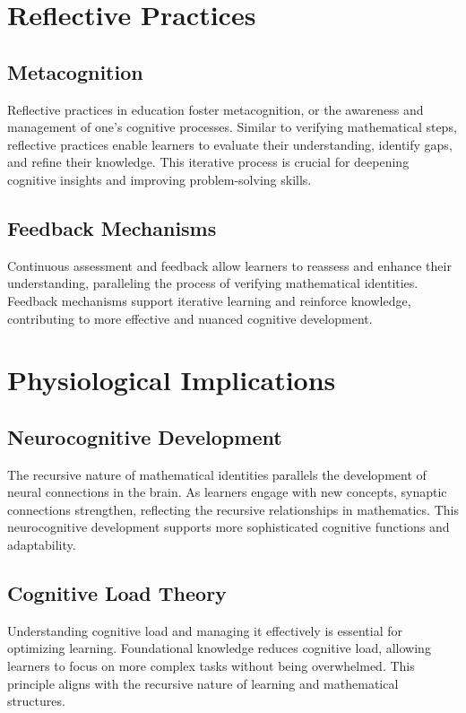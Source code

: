 \documentclass{article}
\begin{document}
\begin{enumerate}
\section{Reflective Practices}

\subsection{Metacognition}
Reflective practices in education foster metacognition, or the awareness and management of one's cognitive processes. Similar to verifying mathematical steps, reflective practices enable learners to evaluate their understanding, identify gaps, and refine their knowledge. This iterative process is crucial for deepening cognitive insights and improving problem-solving skills.

\subsection{Feedback Mechanisms}
Continuous assessment and feedback allow learners to reassess and enhance their understanding, paralleling the process of verifying mathematical identities. Feedback mechanisms support iterative learning and reinforce knowledge, contributing to more effective and nuanced cognitive development.

\section{Physiological Implications}

\subsection{Neurocognitive Development}
The recursive nature of mathematical identities parallels the development of neural connections in the brain. As learners engage with new concepts, synaptic connections strengthen, reflecting the recursive relationships in mathematics. This neurocognitive development supports more sophisticated cognitive functions and adaptability.

\subsection{Cognitive Load Theory}
Understanding cognitive load and managing it effectively is essential for optimizing learning. Foundational knowledge reduces cognitive load, allowing learners to focus on more complex tasks without being overwhelmed. This principle aligns with the recursive nature of learning and mathematical structures.


\end{enumerate}
\end{document}
